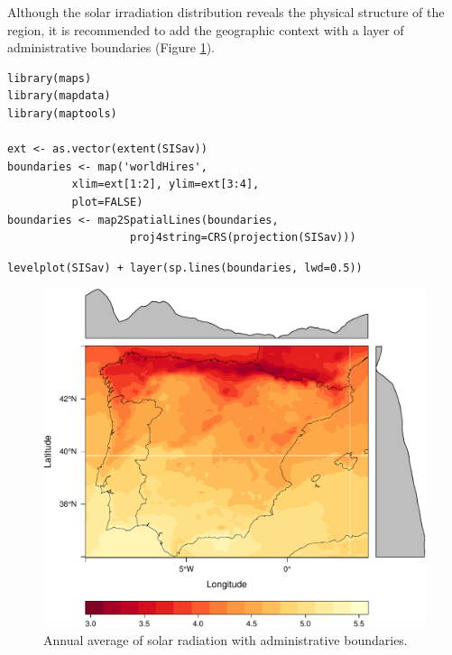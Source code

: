 \documentclass[smallroyalvopaper]{memoir}
\begin{document}
Although the solar irradiation distribution reveals the physical
structure of the region, it is recommended to add the geographic
context with a layer of administrative boundaries (Figure
\ref{fig:levelplotCMSAF_boundaries}).


\lstset{language=R,numbers=none}
\begin{lstlisting}
library(maps)
library(mapdata)
library(maptools)

ext <- as.vector(extent(SISav))
boundaries <- map('worldHires',
		  xlim=ext[1:2], ylim=ext[3:4],
		  plot=FALSE)
boundaries <- map2SpatialLines(boundaries,
			       proj4string=CRS(projection(SISav)))
\end{lstlisting}


\lstset{language=R,numbers=none}
\begin{lstlisting}
levelplot(SISav) + layer(sp.lines(boundaries, lwd=0.5))
\end{lstlisting}

\begin{figure}[htb]
\centering
\includegraphics[width=.9\linewidth]{figs/leveplotSISavBoundaries.pdf}
\caption{\label{fig:levelplotCMSAF_boundaries}Annual average of solar radiation with administrative boundaries.}
\end{figure}
\end{document}
